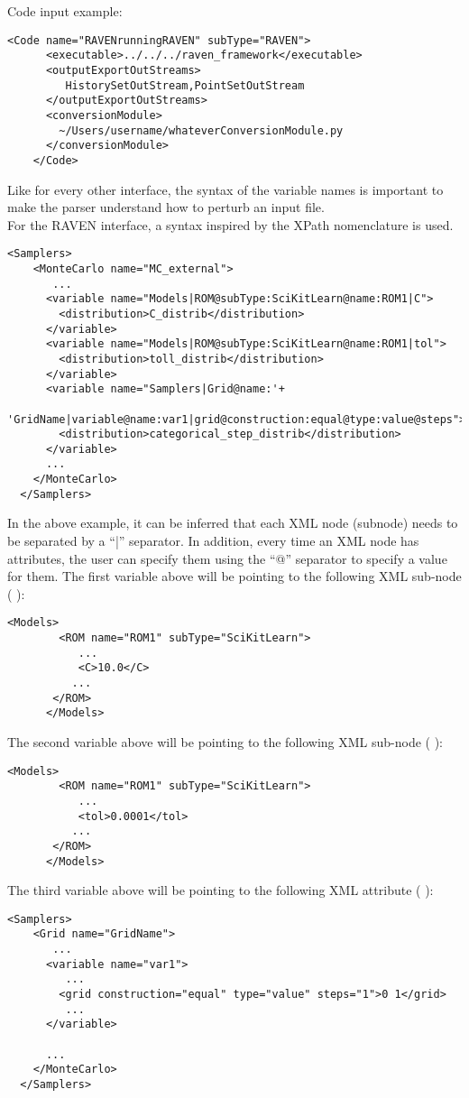 Code input example:
\begin{lstlisting}[style=XML]
    <Code name="RAVENrunningRAVEN" subType="RAVEN">
      <executable>../../../raven_framework</executable>
      <outputExportOutStreams>
         HistorySetOutStream,PointSetOutStream
      </outputExportOutStreams>
      <conversionModule>
        ~/Users/username/whateverConversionModule.py
      </conversionModule>
    </Code>
\end{lstlisting}

Like for every other interface,  the syntax of the variable names is important to make the parser understand how to perturb an input file.
\\ For the RAVEN interface, a syntax inspired by the XPath nomenclature is used.
\begin{lstlisting}[style=XML]
  <Samplers>
    <MonteCarlo name="MC_external">
       ...
      <variable name="Models|ROM@subType:SciKitLearn@name:ROM1|C">
        <distribution>C_distrib</distribution>
      </variable>
      <variable name="Models|ROM@subType:SciKitLearn@name:ROM1|tol">
        <distribution>toll_distrib</distribution>
      </variable>
      <variable name="Samplers|Grid@name:'+
            'GridName|variable@name:var1|grid@construction:equal@type:value@steps">
        <distribution>categorical_step_distrib</distribution>
      </variable>
      ...
    </MonteCarlo>
  </Samplers>
\end{lstlisting}
In the above example, it can be inferred that each XML node (subnode) needs to be separated by a ``|'' separator. In addition,
every time an XML node has attributes, the user can specify them using the ``@'' separator to specify a value for them.
The first variable above will be pointing to the following XML sub-node ( ):
\begin{lstlisting}[style=XML]
      <Models>
        <ROM name="ROM1" subType="SciKitLearn">
           ...
           <C>10.0</C>
          ...
       </ROM>
      </Models>
\end{lstlisting}
The second variable above will be pointing to the following XML sub-node ( ):
\begin{lstlisting}[style=XML]
      <Models>
        <ROM name="ROM1" subType="SciKitLearn">
           ...
           <tol>0.0001</tol>
          ...
       </ROM>
      </Models>
\end{lstlisting}
The third variable above will be pointing to the following XML attribute ( ):
\begin{lstlisting}[style=XML]
  <Samplers>
    <Grid name="GridName">
       ...
      <variable name="var1">
         ...
        <grid construction="equal" type="value" steps="1">0 1</grid>
         ...
      </variable>

      ...
    </MonteCarlo>
  </Samplers>
\end{lstlisting}

